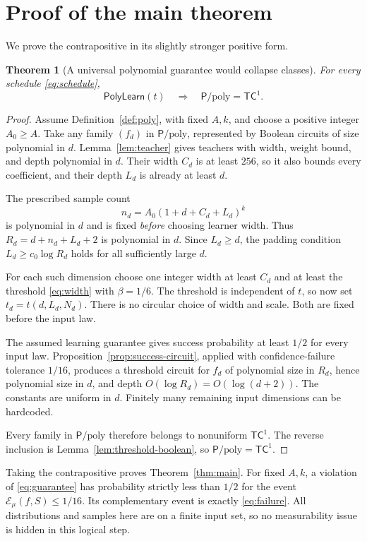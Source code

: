\documentclass[11pt]{article}
\newtheorem{theorem}{Theorem}[section]
\theoremstyle{remark}\newtheorem{remark}[theorem]{Remark}
\newcommand{\Pp}{\mathsf P/\mathrm{poly}}
\newcommand{\TC}{\mathsf{TC}}
\begin{document}
\section{Proof of the main theorem}

We prove the contrapositive in its slightly stronger positive form.

\begin{theorem}[A universal polynomial guarantee would collapse classes]
\label{thm:collapse}
For every schedule \eqref{eq:schedule},
\[
 \mathsf{PolyLearn}(t)\quad\Longrightarrow\quad\Pp=\TC^1.
\]
\end{theorem}
\begin{proof}
Assume Definition~\ref{def:poly}, with fixed $A,k$, and choose a positive
integer $A_0\ge A$. Take any family
$(f_d)$ in $\Pp$, represented by Boolean circuits of size polynomial in
$d$. Lemma~\ref{lem:teacher} gives teachers with width, weight bound,
and depth polynomial in $d$. Their width $C_d$ is at least $256$, so it
also bounds every coefficient, and their depth $L_d$ is already at least
$d$.

The prescribed sample count
\[
 n_d=A_0(1+d+C_d+L_d)^k
\]
is polynomial in $d$ and is fixed \emph{before} choosing learner width.
Thus $R_d=d+n_d+L_d+2$ is polynomial in $d$. Since $L_d\ge d$, the
padding condition $L_d\ge c_0\log R_d$ holds for all sufficiently large
$d$.

For each such dimension choose one integer width at least $C_d$ and at
least the threshold \eqref{eq:width} with $\beta=1/6$. The threshold is
independent of $t$, so now set $t_d=t(d,L_d,N_d)$. There is no circular
choice of width and scale. Both are fixed before the input law.

The assumed learning guarantee gives success probability at least $1/2$
for every input law. Proposition~\ref{prop:success-circuit}, applied
with confidence-failure tolerance $1/16$, produces a threshold circuit for $f_d$ of
polynomial size in $R_d$, hence polynomial size in $d$, and depth
$O(\log R_d)=O(\log(d+2))$. The constants are uniform in $d$.
Finitely many remaining input dimensions can be hardcoded.

Every family in $\Pp$ therefore belongs to nonuniform $\TC^1$.
The reverse inclusion is Lemma~\ref{lem:threshold-boolean}, so
$\Pp=\TC^1$.
\end{proof}

Taking the contrapositive proves Theorem~\ref{thm:main}.
For fixed $A,k$, a violation of \eqref{eq:guarantee} has probability
strictly less than $1/2$ for the event $\mathcal E_\mu(f,S)\le1/16$.
Its complementary event is exactly \eqref{eq:failure}. All distributions
and samples here are on a finite input set, so no measurability issue is
hidden in this logical step.
\end{document}

